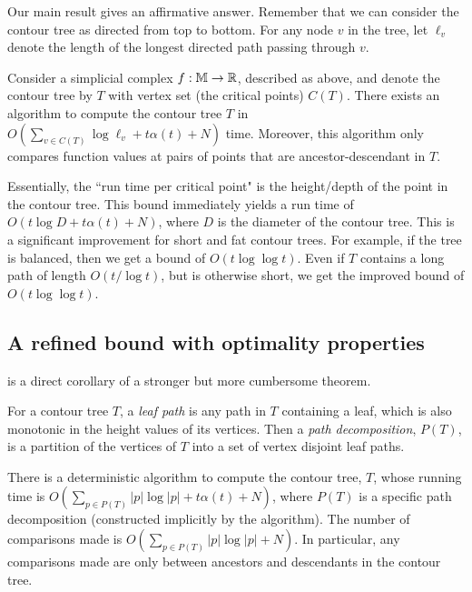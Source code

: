 Our main result gives an affirmative answer. Remember that we can consider
the contour tree as directed from top to bottom. For any node $v$ in the tree, let $\ell_v$ denote the length of the 
longest directed path passing through $v$. 

\begin{theorem} \label{thm:main-corr} Consider a simplicial complex $f:\mathbb{M} \to \mathbb{R}$, described as above, and denote
the contour tree by $T$ with vertex set (the critical points) $C(T)$. There exists an algorithm to compute the contour tree $T$
in $O(\sum_{v \in C(T)} \log \ell_v + t\alpha(t) + N)$ time. Moreover, this algorithm only
compares function values at pairs of points that are ancestor-descendant in $T$.
\end{theorem}

Essentially, the ``run time per critical point" is the height/depth of the point in the contour tree.
This bound immediately yields a run time of $O(t\log D + t\alpha(t) + N)$,
where $D$ is the diameter of the contour tree. 
This is a significant improvement for short and fat contour trees. For example, if the tree is balanced,
then we get a bound of $O(t\log\log t)$.
Even if $T$ contains a long path of length $O(t/\log t)$, but is otherwise short, we get the improved bound of $O(t\log\log t)$.

\subsection{A refined bound with optimality properties}\label{sec:more-refined}

 is a direct corollary of a stronger but more cumbersome theorem.



\begin{definition}
\label{def:path} 
For a contour tree $T$, a \emph{leaf path} is any path in $T$ containing a leaf, 
which is also monotonic in the height values of its vertices. 
Then a \emph{path decomposition}, $P(T)$, is a partition of the vertices of $T$ into a set of vertex disjoint leaf paths.  
\end{definition}

\begin{theorem} 
\label{thm:main-alg} 
There is a deterministic algorithm to compute the contour tree, $T$, whose running time is $O(\sum_{p \in P(T)} |p|\log |p| + t\alpha(t) + N)$,
where $P(T)$ is a specific path decomposition (constructed implicitly by the algorithm).
The number of comparisons made is $O(\sum_{p \in P(T)} |p|\log |p| + N)$.
In particular, any comparisons made are only between ancestors and descendants in the contour tree.
\end{theorem}

